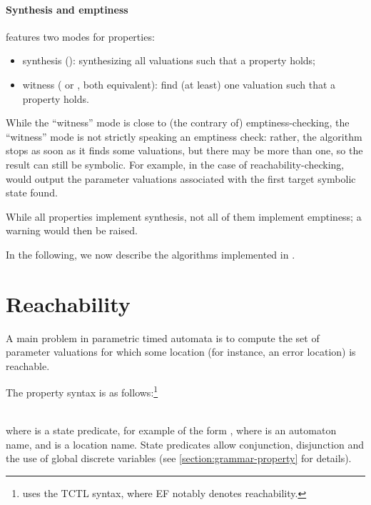 
\paragraph{Synthesis and emptiness}
\imitator{} features two modes for properties:

\begin{itemize}
	\item synthesis (): synthesizing all valuations such that a property holds;
	\item witness ( or , both equivalent): find (at least) one valuation such that a property holds.
\end{itemize}

While the ``witness'' mode is close to (the contrary of) emptiness-checking, the ``witness'' mode is not strictly speaking an emptiness check: rather, the algorithm stops as soon as it finds some valuations, but there may be more than one, so the result can still be symbolic.
For example, in the case of reachability-checking, \imitator{} would output the parameter valuations associated with the first target symbolic state found.


While all properties implement synthesis, not all of them implement emptiness; a warning would then be raised.

In the following, we now describe the algorithms implemented in \imitator{}.

\section{Reachability}\label{ss:mode:EFsynth}

A main problem in parametric timed automata is to compute the set of parameter valuations for which some location (for instance, an error location) is reachable.

The property syntax is as follows:\footnote{%
	\imitator{} uses the TCTL syntax, where EF notably denotes reachability.
}

\\
where  is a state predicate, for example of the form , where  is an automaton name, and  is a location name.
State predicates allow conjunction, disjunction and the use of global discrete variables (see \cref{section:grammar-property} for details).



